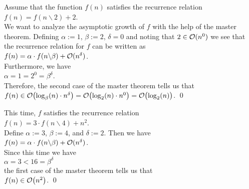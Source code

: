 \example
Assume that the function $f(n)$ satisfies the recurrence relation
\\[0.2cm]
\hspace*{1.3cm}
$f(n) = f(n \backslash 2) + 2$.
\\[0.2cm]
We want to analyze the asymptotic growth of $f$ with the help of the master theorem.
Defining $\alpha := 1$, $\beta := 2$,  $\delta = 0$ and noting that $2 \in \mathcal{O}(n^0)$ we see that
the recurrence relation for $f$ can be written as
\\[0.2cm]
\hspace*{1.3cm}
$f(n) = \alpha \cdot f(n \backslash \beta) + \mathcal{O}(n^\delta)$.
\\[0.2cm]
Furthermore, we have
\\[0.2cm]
\hspace*{1.3cm}
$\alpha = 1 = 2^0 = \beta^\delta$.
\\[0.2cm]
Therefore, the second case of the master theorem tells us that
\\[0.2cm]
\hspace*{1.3cm}
$f(n) \in \mathcal{O}\bigl(\log_\beta(n) \cdot n^\delta\bigr) = \mathcal{O}\bigl(\log_2(n) \cdot n^0\bigr) = \mathcal{O}\bigl(\log_2(n)\bigr)$.
\qed

\example
This time, $f$ satisfies the recurrence relation 
\\[0.2cm]
\hspace*{1.3cm}
$f(n) = 3 \cdot f(n \backslash 4) + n^2$.
\\[0.2cm]
Define $\alpha := 3$, $\beta := 4$, and $\delta := 2$.  Then we have
\\[0.2cm]
\hspace*{1.3cm}
$f(n) = \alpha \cdot f(n \backslash \beta) + \mathcal{O}(n^\delta)$.
\\[0.2cm]
Since this time we have
\\[0.2cm]
\hspace*{1.3cm}
$\alpha = 3 < 16 = \beta^\delta$
\\[0.2cm]
the first case of the master theorem tells us that
\\[0.2cm]
\hspace*{1.3cm}
$f(n) \in \mathcal{O}\bigl(n^2\bigr)$.  \qed

